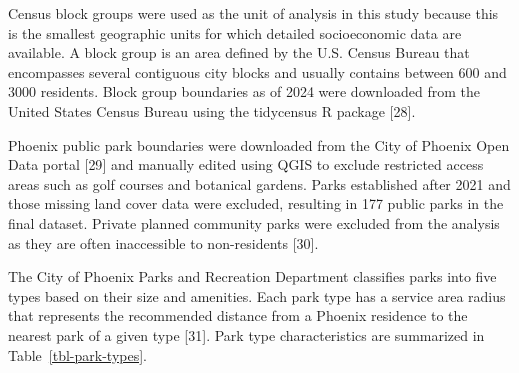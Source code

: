 \documentclass[
  sn-basic,
]{sn-jnl}
\begin{document}
Census block groups were used as the unit of analysis in this study
because this is the smallest geographic units for which detailed
socioeconomic data are available. A block group is an area defined by
the U.S. Census Bureau that encompasses several contiguous city blocks
and usually contains between 600 and 3000 residents. Block group
boundaries as of 2024 were downloaded from the United States Census
Bureau using the tidycensus R package {[}28{]}.

Phoenix public park boundaries were downloaded from the City of Phoenix
Open Data portal {[}29{]} and manually edited using QGIS to exclude
restricted access areas such as golf courses and botanical gardens.
Parks established after 2021 and those missing land cover data were
excluded, resulting in 177 public parks in the final dataset. Private
planned community parks were excluded from the analysis as they are
often inaccessible to non-residents {[}30{]}.

The City of Phoenix Parks and Recreation Department classifies parks
into five types based on their size and amenities. Each park type has a
service area radius that represents the recommended distance from a
Phoenix residence to the nearest park of a given type {[}31{]}. Park
type characteristics are summarized in Table~\ref{tbl-park-types}.

\begin{table}

\caption{\label{tbl-park-types}Typical amenities, sizes, and service
area radius of Phoenix public park types}


\end{table}%
\end{document}

